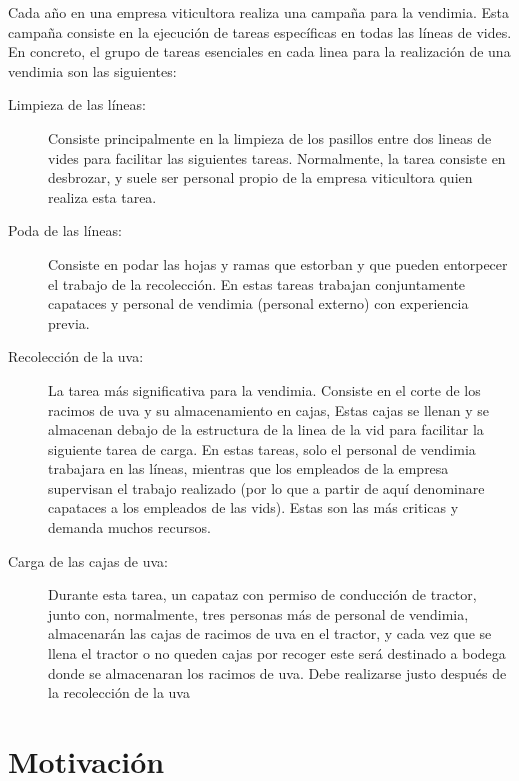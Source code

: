   Cada año en una empresa viticultora realiza una campaña para la vendimia. Esta campaña consiste en la ejecución de tareas específicas en todas las líneas de vides. 
  En concreto, el grupo de tareas esenciales en cada linea para la realización de una vendimia son las siguientes:
\begin{description}
  \item[Limpieza de las líneas:] Consiste principalmente en la limpieza de los pasillos entre dos lineas de vides para facilitar las siguientes tareas. 
  Normalmente, la tarea consiste en desbrozar, y suele ser personal propio de la empresa viticultora quien realiza esta tarea.

  \item[Poda de las líneas:] Consiste en podar las hojas y ramas que estorban y que pueden entorpecer el trabajo de la recolección. 
  En estas tareas trabajan conjuntamente capataces y personal de vendimia (personal externo) con experiencia previa.
  
  \item[Recolección de la uva:]
  La tarea más significativa para la vendimia. Consiste en el corte de los racimos de uva y su almacenamiento en cajas, 
  Estas cajas se llenan y se almacenan debajo de la estructura de la linea de la vid para facilitar la siguiente tarea de carga. 
  En estas tareas, solo el personal de vendimia trabajara en las líneas, mientras que los empleados de la empresa supervisan el trabajo realizado 
  (por lo que a partir de aquí denominare capataces a los empleados de las vids). Estas son las más criticas y demanda muchos recursos. 

  \item[Carga de las cajas de uva:] Durante esta tarea, un capataz con permiso de conducción de tractor, junto con, normalmente, tres personas más de personal de vendimia, 
  almacenarán las cajas de racimos de uva en el tractor, y cada vez que se llena el tractor o no queden cajas por recoger este será destinado a bodega donde se almacenaran los racimos de uva. Debe realizarse justo después de la recolección de la uva


\end{description}

\section{Motivación}

